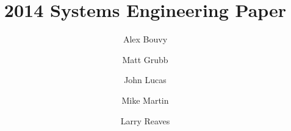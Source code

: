 \documentclass{article}
\begin{document}
\title{2014 Systems Engineering Paper}
\author{Alex Bouvy \and Matt Grubb \and John Lucas \and Mike Martin \and Larry Reaves}
\maketitle
\pagebreak
\tableofcontents
\pagebreak
\begin{multicols}{2}



\end{multicols}
\end{document}
